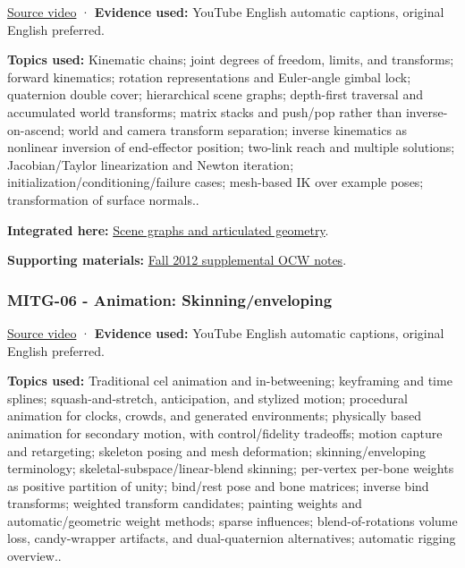\href{https://www.youtube.com/watch?v=-Dhx44D0Iok}{Source video} · \textbf{Evidence used:} YouTube English automatic captions, original English preferred.

\textbf{Topics used:} Kinematic chains; joint degrees of freedom, limits, and transforms; forward kinematics; rotation representations and Euler-angle gimbal lock; quaternion double cover; hierarchical scene graphs; depth-first traversal and accumulated world transforms; matrix stacks and push/pop rather than inverse-on-ascend; world and camera transform separation; inverse kinematics as nonlinear inversion of end-effector position; two-link reach and multiple solutions; Jacobian/Taylor linearization and Newton iteration; initialization/conditioning/failure cases; mesh-based IK over example poses; transformation of surface normals..

\textbf{Integrated here:} \hyperref[04-visual-computing-ii-ch029-scene-graphs-and-articulated-geometry]{Scene graphs and articulated geometry}.

\textbf{Supporting materials:} \href{https://ocw.mit.edu/courses/6-837-computer-graphics-fall-2012/pages/lecture-notes/}{Fall 2012 supplemental OCW notes}.

\subsubsection{MITG-06 - Animation: Skinning/enveloping}\label{04-visual-computing-ii-ch036-mitg-06---animation-skinningenveloping}

\href{https://www.youtube.com/watch?v=oAQkIAGKvUI}{Source video} · \textbf{Evidence used:} YouTube English automatic captions, original English preferred.

\textbf{Topics used:} Traditional cel animation and in-betweening; keyframing and time splines; squash-and-stretch, anticipation, and stylized motion; procedural animation for clocks, crowds, and generated environments; physically based animation for secondary motion, with control/fidelity tradeoffs; motion capture and retargeting; skeleton posing and mesh deformation; skinning/enveloping terminology; skeletal-subspace/linear-blend skinning; per-vertex per-bone weights as positive partition of unity; bind/rest pose and bone matrices; inverse bind transforms; weighted transform candidates; painting weights and automatic/geometric weight methods; sparse influences; blend-of-rotations volume loss, candy-wrapper artifacts, and dual-quaternion alternatives; automatic rigging overview..

